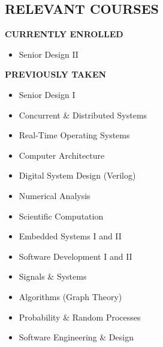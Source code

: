 \documentclass[margin]{res}
\begin{document}
\begin{resume}
  \section{RELEVANT COURSES}
  \vspace{-.125em}
  {\footnotesize\textbf{CURRENTLY ENROLLED}}
  \vspace{-.75em}
  \begin{multicols}{2}
    \begin{itemize}
      \item Senior Design II
    \end{itemize}
  \end{multicols}
  \vspace{-1.5em}
  {\footnotesize\textbf{PREVIOUSLY TAKEN}}
  \vspace{-.75em}
  \begin{multicols}{2}
    \begin{itemize}
    \item Senior Design I
    \item Concurrent \& Distributed Systems
    \item Real-Time Operating Systems
    \item Computer Architecture
    \item Digital System Design (Verilog)
    \item Numerical Analysis
    \item Scientific Computation
    \item Embedded Systems I and II
    \item Software Development I and II
    \item Signals \& Systems
    \item Algorithms (Graph Theory)
    \item Probability \& Random Processes
    \item Software Engineering \& Design
    \end{itemize}
  \end{multicols}


\end{resume}
\end{document}
